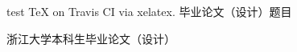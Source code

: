 \documentclass{article}
\begin{document}
test TeX on Travis CI via xelatex.
毕业论文（设计）题目 

浙江大学本科生毕业论文（设计）
\end{document}
